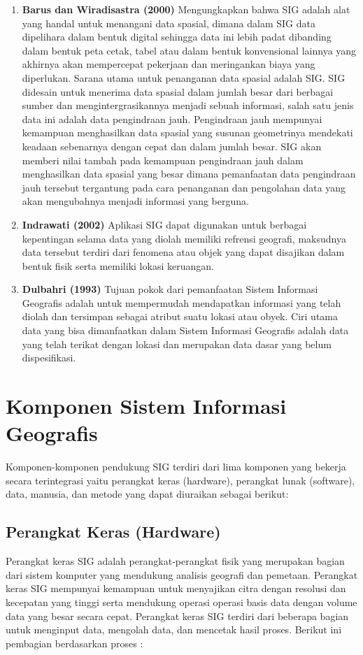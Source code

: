 \begin{enumerate}
\item \textbf{Barus dan Wiradisastra (2000)} 
\subitem Mengungkapkan bahwa SIG adalah alat yang handal untuk menangani data spasial, dimana dalam SIG data dipelihara dalam bentuk digital sehingga data ini lebih padat dibanding dalam bentuk peta cetak, tabel atau dalam bentuk konvensional lainnya yang akhirnya akan mempercepat pekerjaan dan meringankan biaya yang diperlukan.
Sarana utama untuk penanganan data spasial adalah SIG. SIG didesain untuk menerima data spasial dalam jumlah besar dari berbagai sumber dan mengintergrasikannya menjadi sebuah informasi, salah satu jenis data ini adalah data pengindraan jauh. Pengindraan jauh mempunyai kemampuan menghasilkan data spasial yang susunan geometrinya mendekati keadaan sebenarnya dengan cepat dan dalam jumlah besar. 
SIG akan memberi nilai tambah pada kemampuan pengindraan jauh dalam menghasilkan data spasial yang besar dimana pemanfaatan data pengindraan jauh tersebut tergantung pada cara penanganan dan pengolahan data yang akan mengubahnya menjadi informasi yang berguna.

\item \textbf{Indrawati (2002)}
\subitem Aplikasi SIG dapat digunakan untuk berbagai kepentingan selama data yang diolah memiliki refrensi geografi, maksudnya data tersebut terdiri dari fenomena atau objek yang dapat disajikan dalam bentuk fisik serta memiliki lokasi keruangan.

\item \textbf{Dulbahri (1993)}
\subitem Tujuan pokok dari pemanfaatan Sistem Informasi Geografis adalah untuk mempermudah mendapatkan informasi yang telah diolah dan tersimpan sebagai atribut suatu lokasi atau obyek. Ciri utama data yang bisa dimanfaatkan dalam Sistem Informasi Geografis adalah data yang telah terikat dengan lokasi dan merupakan data dasar yang belum dispesifikasi.
\end{enumerate}

\section{Komponen Sistem Informasi Geografis}
Komponen-komponen pendukung SIG terdiri dari lima komponen yang bekerja secara terintegrasi yaitu perangkat keras (hardware), perangkat lunak (software), data, manusia, dan metode yang dapat diuraikan sebagai berikut:

\subsection{Perangkat Keras (Hardware)}
 Perangkat keras SIG adalah perangkat-perangkat fisik yang merupakan bagian dari sistem komputer yang mendukung analisis geografi dan pemetaan. Perangkat keras SIG mempunyai kemampuan untuk menyajikan citra dengan resolusi dan kecepatan yang tinggi serta mendukung operasi operasi basis data dengan volume data yang besar secara cepat. Perangkat keras SIG terdiri dari beberapa bagian untuk menginput data, mengolah data, dan mencetak hasil proses. Berikut ini pembagian berdasarkan proses :

